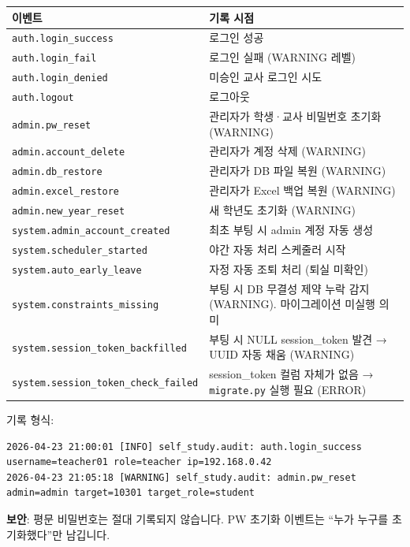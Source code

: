 \documentclass[a4paper,12pt]{article}
\begin{document}
\begin{center}
\begin{tabularx}{\textwidth}{lX}
\toprule
\textbf{이벤트} & \textbf{기록 시점} \\
\midrule
\texttt{auth.login\_success}        & 로그인 성공 \\
\texttt{auth.login\_fail}           & 로그인 실패 (WARNING 레벨) \\
\texttt{auth.login\_denied}         & 미승인 교사 로그인 시도 \\
\texttt{auth.logout}                & 로그아웃 \\
\texttt{admin.pw\_reset}            & 관리자가 학생·교사 비밀번호 초기화 (WARNING) \\
\texttt{admin.account\_delete}      & 관리자가 계정 삭제 (WARNING) \\
\texttt{admin.db\_restore}          & 관리자가 DB 파일 복원 (WARNING) \\
\texttt{admin.excel\_restore}       & 관리자가 Excel 백업 복원 (WARNING) \\
\texttt{admin.new\_year\_reset}     & 새 학년도 초기화 (WARNING) \\
\texttt{system.admin\_account\_created} & 최초 부팅 시 admin 계정 자동 생성 \\
\texttt{system.scheduler\_started}  & 야간 자동 처리 스케줄러 시작 \\
\texttt{system.auto\_early\_leave}  & 자정 자동 조퇴 처리 (퇴실 미확인) \\
\texttt{system.constraints\_missing} & 부팅 시 DB 무결성 제약 누락 감지 (WARNING). 마이그레이션 미실행 의미 \\
\texttt{system.session\_token\_backfilled} & 부팅 시 NULL session\_token 발견 → UUID 자동 채움 (WARNING) \\
\texttt{system.session\_token\_check\_failed} & session\_token 컬럼 자체가 없음 → \texttt{migrate.py} 실행 필요 (ERROR) \\
\bottomrule
\end{tabularx}
\end{center}

기록 형식:

\begin{lstlisting}
2026-04-23 21:00:01 [INFO] self_study.audit: auth.login_success username=teacher01 role=teacher ip=192.168.0.42
2026-04-23 21:05:18 [WARNING] self_study.audit: admin.pw_reset admin=admin target=10301 target_role=student
\end{lstlisting}

\textbf{보안}: 평문 비밀번호는 절대 기록되지 않습니다.
PW 초기화 이벤트는 ``누가 누구를 초기화했다''만 남깁니다.
\end{document}
